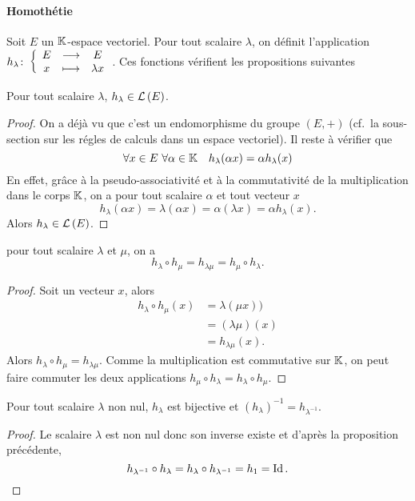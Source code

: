\paragraph{Homothétie}
Soit \(E\) un \(\mathbb{K}\)-espace vectoriel. Pour tout scalaire \(\lambda\), on définit l'application \(h_\lambda\colon \left\{\begin{array}{ccc} E & \longrightarrow &E\\ x & \longmapsto & \lambda x \end{array} \right.\). Ces fonctions vérifient les propositions suivantes
\begin{prop}
  Pour tout scalaire \(\lambda\), \(h_\lambda \in \mathcal{L}\left(E\right)\).
\end{prop}
\begin{proof}
  On a déjà vu que c'est un endomorphisme du groupe \((E,+)\) (cf.\ la sous-section sur les régles de calculs dans un espace vectoriel). Il reste à vérifier que
  \begin{equation}
    \forall x \in E \ \forall \alpha \in \mathbb{K} \quad h_\lambda(\alpha x)=\alpha h_\lambda(x)
  \end{equation}
  En effet, grâce à la pseudo-associativité et à la commutativité de la multiplication dans le corps \(\mathbb{K}\), on a pour tout scalaire \(\alpha\) et tout vecteur \(x\)
  \begin{equation}
    h_\lambda(\alpha x) = \lambda (\alpha x)= \alpha (\lambda x)=\alpha h_\lambda(x).
  \end{equation}
  Alors \(h_\lambda \in \mathcal{L}\left(E\right)\).
\end{proof}
\begin{prop}
  pour tout scalaire \(\lambda\) et \(\mu\), on a
  \begin{equation}
    h_\lambda \circ h_\mu = h_{\lambda\mu}=h_\mu \circ h_\lambda.
  \end{equation}
\end{prop}
\begin{proof}
  Soit un vecteur \(x\), alors
  \begin{align}
    h_\lambda \circ h_\mu(x)&= \lambda(\mu x)) \\
    &=(\lambda\mu)(x)\\
    &= h_{\lambda\mu}(x).
  \end{align}
  Alors \(h_\lambda \circ h_\mu = h_{\lambda\mu}\). Comme la multiplication est commutative sur \(\mathbb{K}\), on peut faire commuter les deux applications \(h_\mu \circ h_\lambda=h_\lambda \circ h_\mu \).
\end{proof}
\begin{prop}
  Pour tout scalaire \(\lambda\) non nul, \(h_\lambda\) est bijective et \((h_\lambda)^{-1}=h_{\lambda^{-1}}\).
\end{prop}
\begin{proof}
  Le scalaire \(\lambda\) est non nul donc son inverse existe et d'après la proposition précédente,
  \begin{equation}
    h_{\lambda^{-1}} \circ h_\lambda = h_\lambda \circ h_{\lambda^{-1}} = h_1=\operatorname{Id}.
  \end{equation}
\end{proof}

